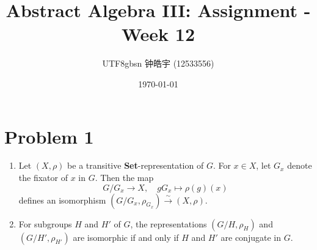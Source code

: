 \documentclass[12pt, a4paper]{article}
\title{Abstract Algebra III: Assignment - Week 12}
\author{
    \begin{CJK*}{UTF8}{gbsn}
    钟皓宇 (12533556)
    \end{CJK*}
}
\date{\today}
\theoremstyle{remark}
\begin{document}
\maketitle
\section*{Problem 1}
\begin{enumerate}
    \item[(i)] Let $(X, \rho)$ be a transitive \textbf{Set}-representation of $G$. For $x \in X$, let $G_x$ denote the fixator of $x$ in $G$. Then the map
    $$
    G/G_x \to X, \quad gG_x \mapsto \rho(g)(x)
    $$
    defines an isomorphism $(G/G_x, \rho_{G_x}) \xrightarrow{\sim} (X, \rho)$.
    \item[(ii)] For subgroups $H$ and $H'$ of $G$, the representations $(G/H, \rho_H)$ and $(G/H', \rho_{H'})$ are isomorphic if and only if $H$ and $H'$ are conjugate in $G$.
\end{enumerate}
\end{document}
